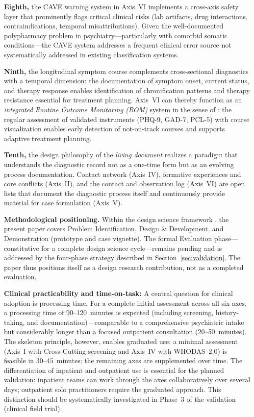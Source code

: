 \documentclass[11pt,a4paper]{article}
\begin{document}
\textbf{Eighth,} the CAVE warning system in Axis~VI implements a cross-axis safety layer that prominently flags critical clinical risks (lab artifacts, drug interactions, contraindications, temporal misattributions). Given the well-documented polypharmacy problem in psychiatry---particularly with comorbid somatic conditions---the CAVE system addresses a frequent clinical error source not systematically addressed in existing classification systems.

\textbf{Ninth,} the longitudinal symptom course complements cross-sectional diagnostics with a temporal dimension: the documentation of symptom onset, current status, and therapy response enables identification of chronification patterns and therapy resistance essential for treatment planning. Axis~VI can thereby function as an \textit{integrated Routine Outcome Monitoring (ROM)} system in the sense of \citet{Barkham2023}: the regular assessment of validated instruments (PHQ-9, GAD-7, PCL-5) with course visualization enables early detection of not-on-track courses and supports adaptive treatment planning.

\textbf{Tenth,} the design philosophy of the \textit{living document} realizes a paradigm that understands the diagnostic record not as a one-time form but as an evolving process documentation. Contact network (Axis~IV), formative experiences and core conflicts (Axis~II), and the contact and observation log (Axis~VI) are open lists that document the diagnostic process itself and continuously provide material for case formulation (Axis~V).

\vspace{0.5em}
\textbf{Methodological positioning.} Within the design science framework \citep{Hevner2004, Peffers2007}, the present paper covers Problem Identification, Design \& Development, and Demonstration (prototype and case vignette). The formal Evaluation phase---constitutive for a complete design science cycle---remains pending and is addressed by the four-phase strategy described in Section~\ref{sec:validation}. The paper thus positions itself as a design research contribution, not as a completed evaluation.

\textbf{Clinical practicability and time-on-task:} A central question for clinical adoption is processing time. For a complete initial assessment across all six axes, a processing time of 90--120~minutes is expected (including screening, history-taking, and documentation)---comparable to a comprehensive psychiatric intake but considerably longer than a focused outpatient consultation (20--50~minutes). The skeleton principle, however, enables graduated use: a minimal assessment (Axis~I with Cross-Cutting screening and Axis~IV with WHODAS~2.0) is feasible in 30--45~minutes; the remaining axes are supplemented over time. The differentiation of inpatient and outpatient use is essential for the planned validation: inpatient teams can work through the axes collaboratively over several days; outpatient solo practitioners require the graduated approach. This distinction should be systematically investigated in Phase~3 of the validation (clinical field trial).
\end{document}
